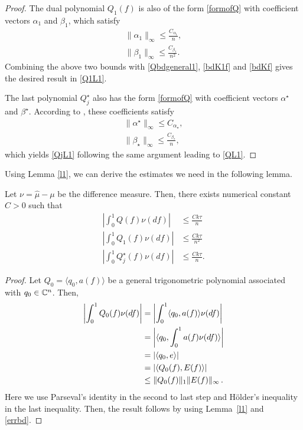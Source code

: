 \begin{proof}
The dual polynomial $Q_1(f)$ is also of the form \eqref{formofQ} with coefficient vectors $\alpha_1$ and $\beta_1$, which satisfy \cite[Proof of Lemma 2.7]{cg_noisy}
\begin{align*}
\|\alpha_1\|_\infty \leq \frac{C_{\alpha_1}}{n},\\
\|\beta_1\|_\infty \leq \frac{C_{\beta_1}}{n^2}.
\end{align*}
Combining the above two bounds with \eqref{Qbdgeneral1}, \eqref{bdK1f} and \eqref{bdKf} gives the desired result in \eqref{Q1L1}.

The last polynomial $Q_j^\star$ also has the form \eqref{formofQ} with coefficient vectors $\alpha^\star$ and $\beta^\star$. According to \cite[Proof of Lemma 2.2]{granda2}, these coefficients satisfy
\begin{align*}
\|\alpha^\star\|_\infty \leq {C_{\alpha_\star}},\\
\|\beta_\star\|_\infty \leq \frac{C_{\beta_\star}}{n},
\end{align*}
which yields \eqref{QjL1} following the same argument leading to \eqref{QL1}. 

\end{proof}

Using Lemma \ref{l1}, we can derive the estimates we need in the following lemma.
\begin{lemma}
\label{l4}
Let $\nu = \hat{\mu} - \mu$ be the difference measure. Then, there exists numerical constant $C>0$ such that
\begin{align}
\label{qv}\left| \int_0^1 Q(f) \nu(df) \right| &\leq \frac{C k \tau}{n}\\
\label{q1v}\left| \int_0^1 Q_1(f) \nu(df) \right| &\leq \frac{C k \tau}{n^2}\\
\label{qjv} \left| \int_0^1 Q_j^\star(f) \nu(df) \right| & \leq \frac{Ck\tau}{n}.
\end{align}
\end{lemma}
\begin{proof}
Let $Q_0 = \langle q_0, a(f) \rangle $ be a general trigonometric polynomial associated with $q_0 \in \mathbb{C}^n$. Then,
\begin{align*}
\left|\int_0^1 Q_0(f) \nu(df) \right| 
& = \left|\int_0^1 \langle q_0 , a(f) \rangle  \nu(df) \right|\\
& = \left|\langle q_0,  \int_0^1  a(f)  \nu(df) \rangle\right|\\
& = \left|\langle q_0, e \rangle\right|\\
& = \left|\langle Q_0(f), E(f) \rangle\right|\\
& \leq \lVert Q_0(f)\rVert_1 \lVert E(f)\rVert_\infty\,.
\end{align*}
Here we use Parseval's identity in the second to last step and H\"{o}lder's inequality in the last inequality. Then, the result follows by using Lemma~\ref{l1} and \eqref{errbd}.
\end{proof}



